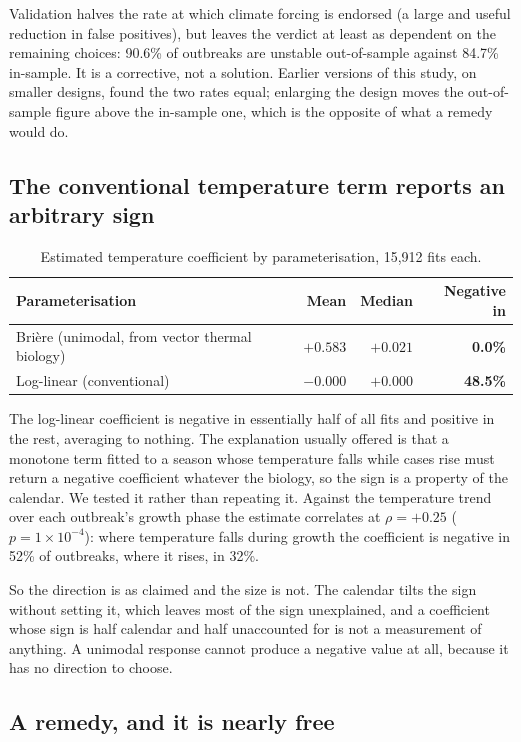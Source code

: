 \documentclass[11pt,a4paper]{article}
\begin{document}
Validation halves the rate at which climate forcing is endorsed (a large and
useful reduction in false positives), but leaves the verdict at least as
dependent on the remaining choices: 90.6\% of outbreaks are unstable
out-of-sample against 84.7\% in-sample. It is a corrective, not a solution.
Earlier versions of this study, on smaller designs, found the two rates equal;
enlarging the design moves the out-of-sample figure above the in-sample one,
which is the opposite of what a remedy would do.

\subsection{The conventional temperature term reports an arbitrary sign}

\begin{table}[htbp]
\centering
\caption{Estimated temperature coefficient by parameterisation, 15{,}912 fits each.}
\begin{tabular}{lrrr}
\toprule
Parameterisation & Mean & Median & Negative in \\
\midrule
Brière (unimodal, from vector thermal biology) & $+0.583$ & $+0.021$ & \textbf{0.0\%} \\
Log-linear (conventional) & $-0.000$ & $+0.000$ & \textbf{48.5\%} \\
\bottomrule
\end{tabular}
\end{table}

The log-linear coefficient is negative in essentially half of all fits and
positive in the rest, averaging to nothing. The explanation usually offered is
that a monotone term fitted to a season whose temperature falls while cases rise
must return a negative coefficient whatever the biology, so the sign is a property
of the calendar. We tested it rather than repeating it. Against the temperature
trend over each outbreak's growth phase the estimate correlates at
$\rho = +0.25$ ($p = 1\times10^{-4}$): where temperature falls during growth the
coefficient is negative in 52\% of outbreaks, where it rises, in 32\%.

So the direction is as claimed and the size is not. The calendar tilts the sign
without setting it, which leaves most of the sign unexplained, and a
coefficient whose sign is half calendar and half unaccounted for is not a
measurement of anything. A unimodal response cannot produce a negative value at
all, because it has no direction to choose.

\subsection{A remedy, and it is nearly free}
\label{sec:remedy}
\end{document}
